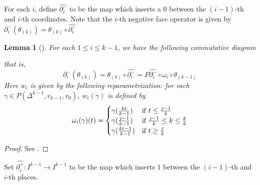\documentclass[12pt]{amsart}
\newtheorem{lem}[thm]{Lemma}
\theoremstyle{definition}
\theoremstyle{remark}
\numberwithin{equation}{section}
\newcommand{\del}{\partial}
\renewcommand{\del}{\partial}
\newcommand{\1}{{\mathbb{1}}}
\begin{document}
For each $i$, define  $\widehat{\del_i^-}$ to be the map which inserts a 0 between the $(i-1)$-th and $i$-th coordinates. Note that the $i$-th negative face operator is given by $\del_i^-(\theta_{(k)}) = \theta_{(k)}\circ \widehat{\del_i^-}$
\begin{lem}[\cite{Igu09}]\label{a1}
    For each $1 \le i \le k - 1$, we have the following commutative diagram
    \begin{center}
    \end{center}
    that is,
$$
\del_i^-(\theta_{(k)}) = \theta_{(k)}\circ \widehat{\del_i^-} =P\widehat{\del_i^-} \circ \omega_i \circ \theta_{(k - 1)}
$$
Here $w_i$ is given by the following reparametrization:
for each $\gamma \in P(\Delta^{k-1}, v_{k-1}, v_0)$, $w_i(\gamma)$ is defined by
\begin{equation*}
    \omega_i(\gamma)(t)  =
    \begin{cases}
        \gamma(\frac{kt}{k - 1}) &\text{if $t\le \frac{j-1}{k}$}\\
        \gamma(\frac{j-1}{k - 1}) &\text{if $ \frac{j-1}{k}\le k \le \frac{k}{k}$} \\
        \gamma(\frac{kt - 1}{k - 1}) &\text{if $t\ge \frac{j}{k}$}
    \end{cases}
\end{equation*}
\end{lem}
\begin{proof}
    See \cite[Lemma 4.7]{Igu09}.
\end{proof}
Set $\widehat{\del_i^+}: I^{k-1} \to I^{k-1}$ to be the map which inserts 1 between the $(i-1)$-th and $i$-th places.
\end{document}
